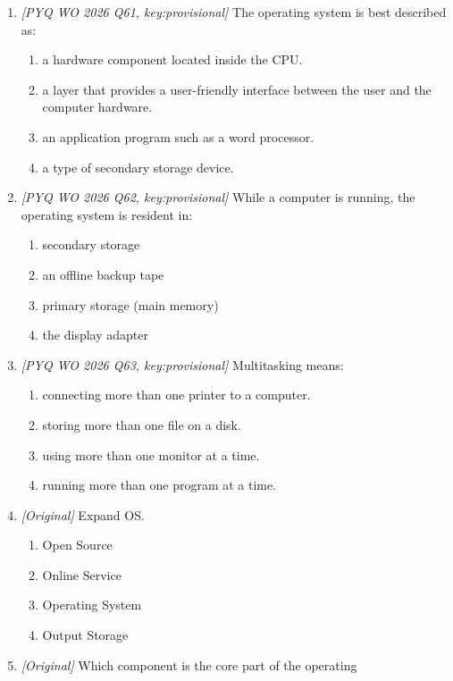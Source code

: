 \begin{enumerate}[label=\textbf{Q\arabic*.}, leftmargin=*]
\item \textit{[PYQ WO 2026 Q61, key:provisional]} The operating system is best
  described as:
  \begin{enumerate}[label=\Alph*.]
    \item a hardware component located inside the CPU.
    \item a layer that provides a user-friendly interface between the user and
      the computer hardware.
    \item an application program such as a word processor.
    \item a type of secondary storage device.
  \end{enumerate}
\item \textit{[PYQ WO 2026 Q62, key:provisional]} While a computer is running,
  the operating system is resident in:
  \begin{enumerate}[label=\Alph*.]
    \item secondary storage
    \item an offline backup tape
    \item primary storage (main memory)
    \item the display adapter
  \end{enumerate}
\item \textit{[PYQ WO 2026 Q63, key:provisional]} Multitasking means:
  \begin{enumerate}[label=\Alph*.]
    \item connecting more than one printer to a computer.
    \item storing more than one file on a disk.
    \item using more than one monitor at a time.
    \item running more than one program at a time.
  \end{enumerate}
\item \textit{[Original]} Expand OS.
  \begin{enumerate}[label=\Alph*.]
    \item Open Source
    \item Online Service
    \item Operating System
    \item Output Storage
  \end{enumerate}
\item \textit{[Original]} Which component is the core part of the operating

\end{enumerate}
